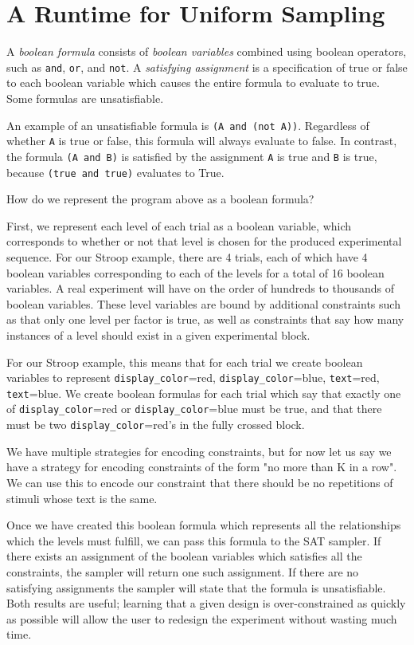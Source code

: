\section{A Runtime for Uniform Sampling}

A \emph{boolean formula} consists of \emph{boolean variables} combined using boolean operators, such as \texttt{and}, \texttt{or}, and \texttt{not}. A \emph{satisfying assignment} is a specification of true or false to each boolean variable which causes the entire formula to evaluate to true. Some formulas are unsatisfiable.

An example of an unsatisfiable formula is \texttt{(A and (not A))}. Regardless of whether \texttt{A} is true or false, this formula will always evaluate to false. In contrast, the formula \texttt{(A and B)} is satisfied by the assignment \texttt{A} is true and \texttt{B} is true, because \texttt{(true and true)} evaluates to True.

How do we represent the program above as a boolean formula?

First, we represent each level of each trial as a boolean variable, which corresponds to whether or not that level is chosen for the produced experimental sequence. For our Stroop example, there are 4 trials, each of which have 4 boolean variables corresponding to each of the levels for a total of 16 boolean variables. A real experiment will have on the order of hundreds to thousands of boolean variables. These level variables are bound by additional constraints such as that only one level per factor is true, as well as constraints that say how many instances of a level should exist in a given experimental block.

For our Stroop example, this means that for each trial we create boolean variables to represent \texttt{display\_color}=red, \texttt{display\_color}=blue, \texttt{text}=red, \texttt{text}=blue. We create boolean formulas for each trial which say that exactly one of \texttt{display\_color}=red or \texttt{display\_color}=blue must be true, and that there must be two \texttt{display\_color}=red's in the fully crossed block.

We have multiple strategies for encoding constraints, but for now let us say we have a strategy for encoding constraints of the form "no more than K in a row". We can use this to encode our constraint that there should be no repetitions of stimuli whose text is the same.

Once we have created this boolean formula which represents all the relationships which the levels must fulfill, we can pass this formula to the SAT sampler. If there exists an assignment of the boolean variables which satisfies all the constraints, the sampler will return one such assignment. If there are no satisfying assignments the sampler will state that the formula is unsatisfiable. Both results are useful; learning that a given design is over-constrained as quickly as possible will allow the user to redesign the experiment without wasting much time.


